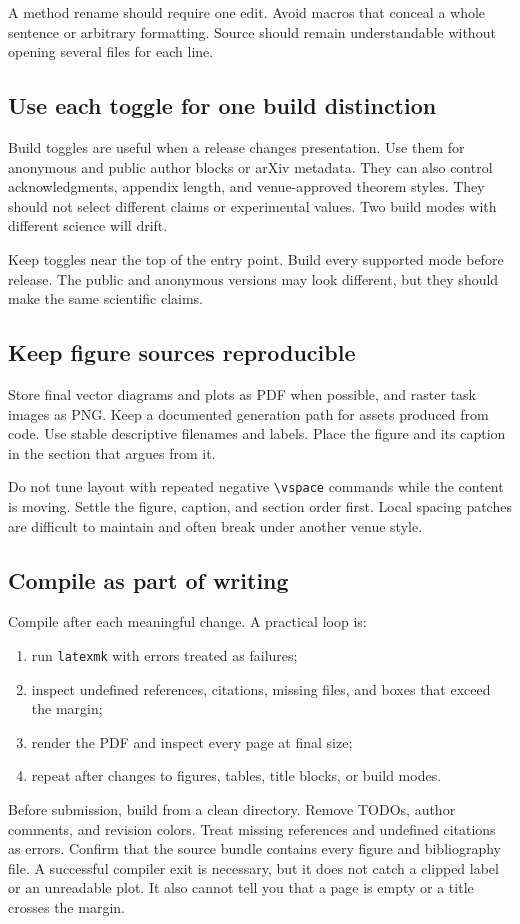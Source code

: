 A method rename should require one edit. Avoid macros that conceal a whole
sentence or arbitrary formatting. Source should remain understandable without
opening several files for each line.

\subsection{Use each toggle for one build distinction}

Build toggles are useful when a release changes presentation. Use them for
anonymous and public author blocks or arXiv metadata. They can also control
acknowledgments, appendix length, and venue-approved theorem styles. They
should not select different claims or experimental values. Two build modes
with different science will drift.

Keep toggles near the top of the entry point. Build every supported mode before
release. The public and anonymous versions may look different, but they should
make the same scientific claims.

\subsection{Keep figure sources reproducible}

Store final vector diagrams and plots as PDF when possible, and raster task
images as PNG. Keep a documented generation path for assets produced from
code. Use stable descriptive filenames and labels. Place the figure and its
caption in the section that argues from it.

Do not tune layout with repeated negative \texttt{\textbackslash vspace}
commands while the content is moving. Settle the figure, caption, and section
order first. Local spacing patches are difficult to maintain and often break
under another venue style.

\subsection{Compile as part of writing}

Compile after each meaningful change. A practical loop is:

\begin{enumerate}[leftmargin=*]
    \item run \texttt{latexmk} with errors treated as failures;
    \item inspect undefined references, citations, missing files, and boxes
    that exceed the margin;
    \item render the PDF and inspect every page at final size;
    \item repeat after changes to figures, tables, title blocks, or build
    modes.
\end{enumerate}

Before submission, build from a clean directory. Remove TODOs, author comments,
and revision colors. Treat missing references and undefined citations as
errors. Confirm that the source bundle contains every figure and bibliography
file. A successful compiler exit is necessary, but it does not catch a clipped
label or an unreadable plot. It also cannot tell you that a page is empty or a
title crosses the margin.
